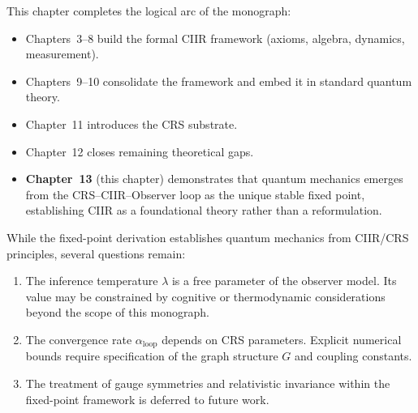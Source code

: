 \begin{remark}
This chapter completes the logical arc of the monograph:
\begin{itemize}
  \item Chapters~3--8 build the formal CIIR framework (axioms,
    algebra, dynamics, measurement).
  \item Chapters~9--10 consolidate the framework and embed it in
    standard quantum theory.
  \item Chapter~11 introduces the CRS substrate.
  \item Chapter~12 closes remaining theoretical gaps.
  \item \textbf{Chapter~13} (this chapter) demonstrates that quantum
    mechanics emerges from the CRS--CIIR--Observer loop as the unique
    stable fixed point, establishing CIIR as a foundational theory
    rather than a reformulation.
\end{itemize}
\end{remark}

\begin{remark}
While the fixed-point derivation establishes quantum mechanics from
CIIR/CRS principles, several questions remain:
\begin{enumerate}
  \item The inference temperature $\lambda$ is a free parameter of the
    observer model.  Its value may be constrained by cognitive or
    thermodynamic considerations beyond the scope of this monograph.
  \item The convergence rate $\alpha_{\mathrm{loop}}$ depends on CRS
    parameters.  Explicit numerical bounds require specification of the
    graph structure $G$ and coupling constants.
  \item The treatment of gauge symmetries and relativistic invariance
    within the fixed-point framework is deferred to future work.
\end{enumerate}
\end{remark}
